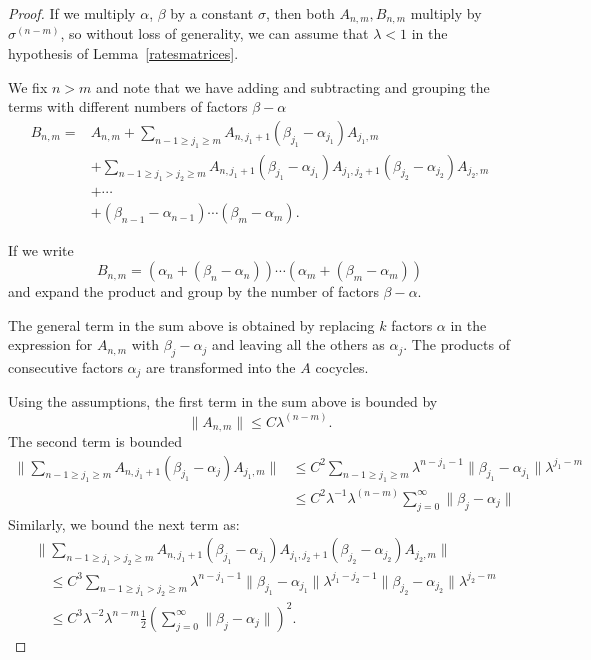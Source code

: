\documentclass[10pt,a4paper]{amsart}
\begin{document}
\begin{proof}
  If we multiply $\alpha$, $\beta$ by a constant $\sigma$, then both
  $A_{n,m},  B_{n,m}$ multiply by $\sigma^{(n-m)}$,  so without
  loss of generality, we can assume that $\lambda <1 $ in the
  hypothesis of Lemma~\ref{ratesmatrices}.


  We fix $n> m$ and
  note that we have adding and subtracting and  grouping the terms
  with different numbers of factors $\beta -\alpha$
  \[
  \begin{split}
    B_{n,m}= &A_{n,m} +
     \sum_{n-1\ge j_1\ge m}  A_{n, j_1+1} (\beta_{j_1} -  \alpha_{j_1}) A_{j_1, m}
     \\
     &+ \sum_{n-1\ge j_1> j_2\ge m} A_{n, j_1+1} (\beta_{j_1} -  \alpha_{j_1})
     A_{j_1, j_2+1}
  (\beta_{j_2} - \alpha_{j_2} ) A_{j_2, m} \\
  &+ \cdots \\
 & + (\beta_{n-1} - \alpha_{n-1}) \cdots (\beta_{m} - \alpha_{m}) .
  \end{split}
  \]

  If we write
  \[
  B_{n,m} = (\alpha_n + (\beta_n - \alpha_n) ) \cdots (\alpha_m + (\beta_m - \alpha_m) )
  \]
  and expand the product and group by the number of factors
  $\beta -\alpha$.

  The general term in the sum above is obtained by replacing $k$
  factors $\alpha$ in
  the expression for $A_{n,m}$
  with $\beta_j - \alpha_j$ and leaving all the others as $\alpha_j$.
  The products of consecutive factors $\alpha_j$ are
  transformed into the $A$ cocycles.

  Using the assumptions, the first term
  in the sum above is bounded by
  \[
  \| A_{n,m} \| \le C\lambda^{(n-m)} .
  \]
  The second term is bounded
  \[
  \begin{split}
\|  \sum_{n-1\ge j_1\ge m}  A_{n, {j_1}+1} (\beta_{j_1}-  \alpha_j) A_{{j_1}, m} \|
&\le C^2 \sum_{n-1\ge j_1\ge m}\lambda^{n-{j_1}-1} \| \beta_{j_1} -  \alpha_{j_1} \|  \lambda^{{j_1}-m} \\
&\le C^2 \lambda^{-1}  \lambda^{(n-m)} \sum_{j=0}^{\infty} \| \beta_{j} - \alpha_{j}\|
  \end{split}
  \]
  Similarly, we bound the next term
  as:
  \[
  \begin{split}
    &\| \sum_{n-1\ge j_1> j_2\ge m} A_{n, j_1+1} (\beta_{j_1} -  \alpha_{j_1}) A_{j_1, j_2+1}
(\beta_{j_2} - \alpha_{j_2} ) A_{j_2, m} \|\\&\quad \le
C^3  \sum_{n-1\ge j_1> j_2\ge m} \lambda^{n-j_1-1} \| \beta_{j_1} -  \alpha_{j_1}\|  \lambda^{j_1-j_2-1}
 \| \beta_{j_2} -  \alpha_{j_2}\|\lambda^{j_2- m }
 \\
&\quad \le C^3 \lambda^{-2}  \lambda^{n-m} \frac{1}{2}
 \left( \sum_{j=0}^{\infty} \| \beta_j - \alpha_j\| \right)^2 .
  \end{split}
  \]


\end{proof}
\end{document}
